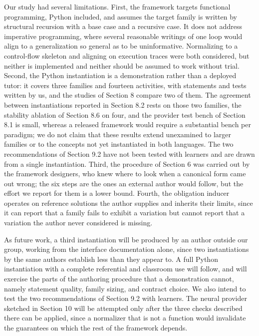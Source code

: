 \documentclass[10pt,twocolumn,letterpaper]{article}
\begin{document}
Our study had several limitations. First, the framework targets
functional programming, Python included, and assumes the target family
is written by structural recursion with a base case and a recursive
case. It does not address imperative programming, where several
reasonable writings of one loop would align to a generalization so
general as to be uninformative. Normalizing to a control-flow skeleton
and aligning on execution traces were both considered, but neither is
implemented and neither should be assumed to work without trial. Second,
the Python instantiation is a demonstration rather than a deployed
tutor: it covers three families and fourteen activities, with statements
and tests written by us, and the studies of Section 8 compare two of
them. The agreement between instantiations reported in Section 8.2 rests
on those two families, the stability ablation of Section 8.6 on four,
and the provider test bench of Section 8.1 is small, whereas a released
framework would require a substantial bench per paradigm; we do not claim
that these results extend unexamined to larger families or to the
concepts not yet instantiated in both languages. The two recommendations
of Section 9.2 have not been tested with learners and are drawn from a
single instantiation.
Third, the procedure of Section 6 was carried out by the framework
designers, who knew where to look when a canonical form came out wrong;
the six steps are the ones an external author would follow, but the
effort we report for them is a lower bound. Fourth, the obligation inducer
operates on reference solutions the author supplies and inherits their
limits, since it can report that a family fails to exhibit a variation
but cannot report that a variation the author never considered is
missing.

As future work, a third instantiation will be produced by an author
outside our group, working from the interface documentation alone, since
two instantiations by the same authors establish less than they appear
to. A full Python instantiation with a complete referential and
classroom use will follow, and will exercise the parts of the authoring
procedure that a demonstration cannot, namely statement quality, family
sizing, and contract choice. We also intend to test the two
recommendations of Section 9.2 with learners. The neural provider sketched in
Section 10 will be attempted only after the three checks described there
can be applied, since a normalizer that is not a function would
invalidate the guarantees on which the rest of the framework depends.
\end{document}

